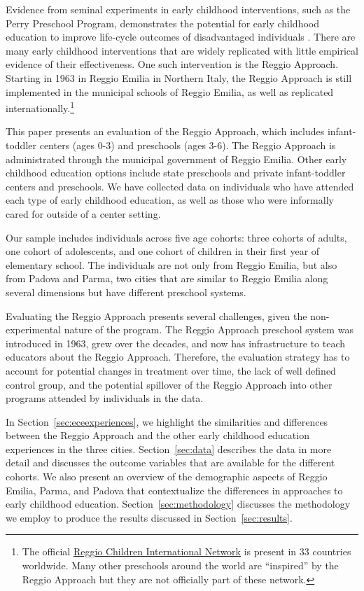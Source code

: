 Evidence from seminal experiments in early childhood interventions, such as the Perry Preschool Program, demonstrates the potential for early childhood education to improve life-cycle outcomes of disadvantaged individuals \citep{Heckman_Moon_etal_2010_QE, Elango_Hojman_etal_2016_Early-Edu}. There are many early childhood interventions that are widely replicated with little empirical evidence of their effectiveness. One such intervention is the Reggio Approach. Starting in 1963 in Reggio Emilia in Northern Italy, the Reggio Approach is still implemented in the municipal schools of Reggio Emilia, as well as replicated internationally.\footnote{The official \href{http://www.reggiochildren.it/network/?lang=en}{Reggio Children International Network} is present in 33 countries worldwide. Many other preschools around the world are ``inspired'' by the Reggio Approach but they are not officially part of these network.}

This paper presents an evaluation of the Reggio Approach, which includes infant-toddler centers (ages 0-3) and preschools (ages 3-6). The Reggio Approach is administrated through the municipal government of Reggio Emilia. Other early childhood education options include state preschools and private infant-toddler centers and preschools. We have collected data on individuals who have attended each type of early childhood education, as well as those who were informally cared for outside of a center setting. 

Our sample includes individuals across five age cohorts: three cohorts of adults, one cohort of adolescents, and one cohort of children in their first year of elementary school. The individuals are not only from Reggio Emilia, but also from Padova and Parma, two cities that are similar to Reggio Emilia along several dimensions but have different preschool systems. 

Evaluating the Reggio Approach presents several challenges, given the non-experimental nature of the program. The Reggio Approach preschool system was introduced in 1963, grew over the decades, and now has infrastructure to teach educators about the Reggio Approach. Therefore, the evaluation strategy has to account for potential changes in treatment over time, the lack of well defined control group, and the potential spillover of the Reggio Approach into other programs attended by individuals in the data. 


In Section~\ref{sec:eceexperiences}, we highlight the similarities and differences between the Reggio Approach and the other early childhood education experiences in the three cities. Section~\ref{sec:data} describes the data in more detail and discusses the outcome variables that are available for the different cohorts. We also present an overview of the demographic aspects of Reggio Emilia, Parma, and Padova that contextualize the differences in approaches to early childhood education. Section~\ref{sec:methodology} discusses the methodology we employ to produce the results discussed in Section~\ref{sec:results}. 

